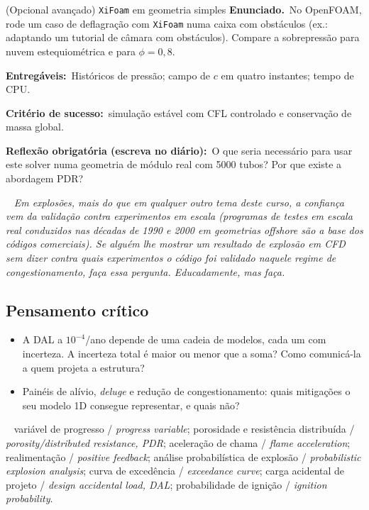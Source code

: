 \documentclass[10pt,a4paper,twocolumn,openany]{report}
\newcommand{\lead}[2]{\par\medskip\noindent{\color{#1}\bfseries #2}\ }
\newenvironment{professor}{\lead{laranja}{Nota do professor.}\itshape}{\par\medskip}
\newenvironment{critico}{\subsection*{\textcolor{roxo}{Pensamento crítico}}}{\par}
\newenvironment{chaves}{\lead{cinza}{Palavras-chave (PT/EN):}\small}{\par}
\newcommand{\enunciado}{\noindent\textbf{Enunciado.}\ }
\newcommand{\entregaveis}{\par\medskip\noindent\textbf{Entregáveis:}}
\newcommand{\criterio}{\par\medskip\noindent\textbf{Critério de sucesso:}\ }
\newcommand{\reflexao}{\par\medskip\noindent\textbf{Reflexão obrigatória (escreva no diário):}}
\begin{document}
\begin{tarefa}{(Opcional avançado) \texttt{XiFoam} em geometria simples}
\enunciado No OpenFOAM, rode um caso de deflagração com \texttt{XiFoam} numa
caixa com obstáculos (ex.: adaptando um tutorial de câmara com obstáculos).
Compare a sobrepressão para nuvem estequiométrica e para $\phi=0{,}8$.
\entregaveis\ Históricos de pressão; campo de $c$ em quatro instantes; tempo
de CPU.
\criterio simulação estável com CFL controlado e conservação de massa global.
\reflexao\ O que seria necessário para usar este solver numa geometria de
módulo real com 5000 tubos? Por que existe a abordagem PDR?
\end{tarefa}

\begin{professor}
Em explosões, mais do que em qualquer outro tema deste curso, a confiança
vem da validação contra experimentos em escala (programas de testes em
escala real conduzidos nas décadas de 1990 e 2000 em geometrias offshore
são a base dos códigos comerciais). Se alguém lhe mostrar um resultado de
explosão em CFD sem dizer contra quais experimentos o código foi validado
\emph{naquele regime de congestionamento}, faça essa pergunta. Educadamente,
mas faça.
\end{professor}

\begin{critico}
\begin{itemize}
  \item A DAL a $10^{-4}$/ano depende de uma cadeia de modelos, cada um com
        incerteza. A incerteza total é maior ou menor que a soma? Como
        comunicá-la a quem projeta a estrutura?
  \item Painéis de alívio, \emph{deluge} e redução de congestionamento:
        quais mitigações o seu modelo 1D consegue representar, e quais não?
\end{itemize}
\end{critico}

\begin{chaves}
variável de progresso / \emph{progress variable}; porosidade e resistência
distribuída / \emph{porosity/distributed resistance, PDR}; aceleração de
chama / \emph{flame acceleration}; realimentação / \emph{positive feedback};
análise probabilística de explosão / \emph{probabilistic explosion analysis};
curva de excedência / \emph{exceedance curve}; carga acidental de projeto /
\emph{design accidental load, DAL}; probabilidade de ignição /
\emph{ignition probability}.
\end{chaves}
\end{document}
